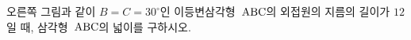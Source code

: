 \noindent\begin{minipage}[t]{0.58\linewidth}\vspace{0pt}\raggedright 오른쪽 그림과 같이 $B=C=30^\circ$인 이등변삼각형~$\mathrm{ABC}$의 외접원의 지름의 길이가 $12$일 때, 삼각형~$\mathrm{ABC}$의 넓이를 구하시오.\end{minipage}\hfill\begin{minipage}[t]{0.4\linewidth}\vspace{0pt}\centering \resizebox{\ifdim\width>\linewidth\linewidth\else\width\fi}{!}{}\end{minipage}\par
